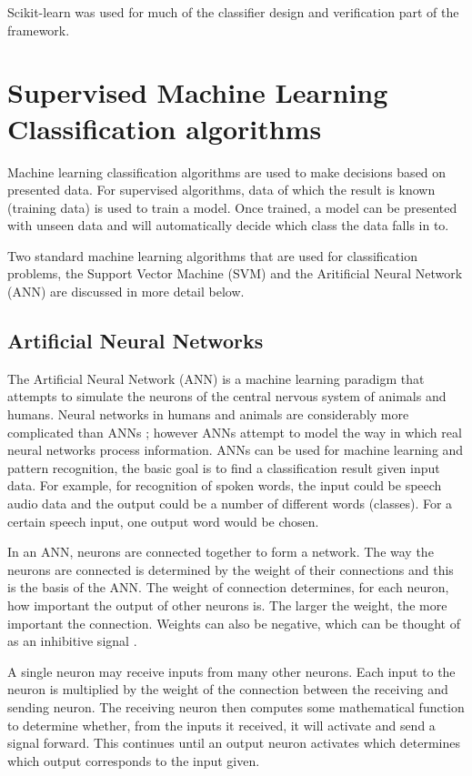Scikit-learn was used for much of the classifier design and verification part of the framework.

\section{Supervised Machine Learning Classification algorithms}

Machine learning classification algorithms are used to make decisions based on presented data. For supervised algorithms, data of which the result is known (training data) is used to train a model. Once trained, a model can be presented with unseen data and will automatically decide which class the data falls in to. 

Two standard machine learning algorithms that are used for classification problems, the Support Vector Machine (SVM) and the Aritificial Neural Network (ANN) are discussed in more detail below. 

\subsection{Artificial Neural Networks}
\label{ANNAppendix}

The Artificial Neural Network (ANN) is a machine learning paradigm that attempts to simulate the neurons of the central nervous system of animals and humans. Neural networks in humans and animals are considerably more complicated than ANNs \cite{Graupe2013}; however ANNs attempt to model the way in which real neural networks process information. ANNs can be used for machine learning and pattern recognition, the basic goal is to find a classification result given input data. For example, for recognition of spoken words, the input could be speech audio data and the output could be a number of different words (classes). For a certain speech input, one output word would be chosen. 

In an ANN, neurons are connected together to form a network. The way the neurons are connected is determined by the weight of their connections and this is the basis of the ANN. The weight of connection determines, for each neuron, how important the output of other neurons is. The larger the weight, the more important the connection. Weights can also be negative, which can be thought of as an inhibitive signal \cite{Graupe2013}.

A single neuron may receive inputs from many other neurons. Each input to the neuron is multiplied by the weight of the connection between the receiving and sending neuron. The receiving neuron then computes some mathematical function to determine whether, from the inputs it received, it will activate and send a signal forward. This continues until an output neuron activates which determines which output corresponds to the input given. 

